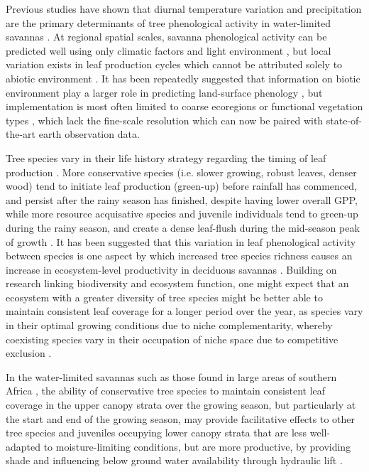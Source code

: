 \documentclass[11pt,a4paper]{article}
\begin{document}
Previous studies have shown that diurnal temperature variation and precipitation are the primary determinants of tree phenological activity in water-limited savannas \citep{}. At regional spatial scales, savanna phenological activity can be predicted well using only climatic factors and light environment \citep{Adole2018}, but local variation exists in leaf production cycles which cannot be attributed solely to abiotic environment \citep{}. It has been repeatedly suggested that information on biotic environment play a larger role in predicting land-surface phenology \citep{}, but implementation is most often limited to coarse ecoregions or functional vegetation types \citep{}, which lack the fine-scale resolution which can now be paired with state-of-the-art earth observation data. 

Tree species vary in their life history strategy regarding the timing of leaf production \citep{}. More conservative species (i.e. slower growing, robust leaves, denser wood) tend to initiate leaf production (green-up) before rainfall has commenced, and persist after the rainy season has finished, despite having lower overall GPP, while more resource acquisative species and juvenile individuals tend to green-up during the rainy season, and create a dense leaf-flush during the mid-season peak of growth \citep{}. It has been suggested that this variation in leaf phenological activity between species is one aspect by which increased tree species richness causes an increase in ecosystem-level productivity in deciduous savannas \citep{}. Building on research linking biodiversity and ecosystem function, one might expect that an ecosystem with a greater diversity of tree species might be better able to maintain consistent leaf coverage for a longer period over the year, as species vary in their optimal growing conditions due to niche complementarity, whereby coexisting species vary in their occupation of niche space due to competitive exclusion \citep{}.

In the water-limited savannas such as those found in large areas of southern Africa \citep{}, the ability of conservative tree species to maintain consistent leaf coverage in the upper canopy strata over the growing season, but particularly at the start and end of the growing season, may provide facilitative effects to other tree species and juveniles occupying lower canopy strata that are less well-adapted to moisture-limiting conditions, but are more productive, by providing shade and influencing below ground water availability through hydraulic lift \citep{}. 
\end{document}
